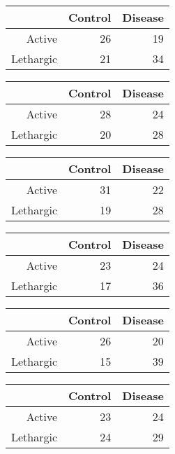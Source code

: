 \documentclass{article}\usepackage{graphicx, color}
\begin{document}
\begin{multicols}{3}
\bigskip
\begin{tabular}{rrr}
  \hline
 & Control & Disease \\ 
  \hline
Active &  26 &  19 \\ 
  Lethargic &  21 &  34 \\ 
   \hline
\end{tabular}


\bigskip
\begin{tabular}{rrr}
  \hline
 & Control & Disease \\ 
  \hline
Active &  28 &  24 \\ 
  Lethargic &  20 &  28 \\ 
   \hline
\end{tabular}


\bigskip
\begin{tabular}{rrr}
  \hline
 & Control & Disease \\ 
  \hline
Active &  31 &  22 \\ 
  Lethargic &  19 &  28 \\ 
   \hline
\end{tabular}


\bigskip
\begin{tabular}{rrr}
  \hline
 & Control & Disease \\ 
  \hline
Active &  23 &  24 \\ 
  Lethargic &  17 &  36 \\ 
   \hline
\end{tabular}


\bigskip
\begin{tabular}{rrr}
  \hline
 & Control & Disease \\ 
  \hline
Active &  26 &  20 \\ 
  Lethargic &  15 &  39 \\ 
   \hline
\end{tabular}


\bigskip
\begin{tabular}{rrr}
  \hline
 & Control & Disease \\ 
  \hline
Active &  23 &  24 \\ 
  Lethargic &  24 &  29 \\ 
   \hline
\end{tabular}



\end{multicols}
\end{document}
